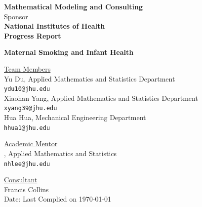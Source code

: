 \documentclass[oneside,12pt]{report}
\begin{document}
\def\thefootnote{\fnsymbol{footnote}}

\thispagestyle{empty}

\def\shiftdowna{0.32in}  %
\def\shiftdownb{0.22in}  %


\begin{center}
\textbf{{\large Mathematical Modeling and Consulting }}\\


\vspace \shiftdowna
\underline {Sponsor}\\ 
\vspace{5pt}
\textbf{\large National Institutes of Health} \\
\vspace\shiftdowna
\textbf{{Progress Report}}

\vspace \shiftdowna
\textbf{{\Large Maternal Smoking and Infant Health}}

\vspace{0.35in}
\underline {Team Members}\\
\vspace{5pt}
Yu Du, Applied Mathematics and Statistics Department\\
\texttt{ydu10@jhu.edu} \\
\vspace{10pt}
Xiaohan Yang, Applied Mathematics and Statistics Department\\
\texttt{xyang39@jhu.edu} \\
\vspace{10pt}
Hua Hua, Mechanical Engineering Department\\
\texttt{hhua1@jhu.edu}

\vspace \shiftdownb
\underline {Academic Mentor} \\
\vspace{5pt}
, Applied Mathematics and Statistics\\
\texttt{nhlee@jhu.edu}

\vspace \shiftdownb 
\underline {Consultant}\\
\vspace{5pt}
Francis Collins\\

\vspace \shiftdowna
Date: Last Complied on \today

\end{center}
\end{document}
